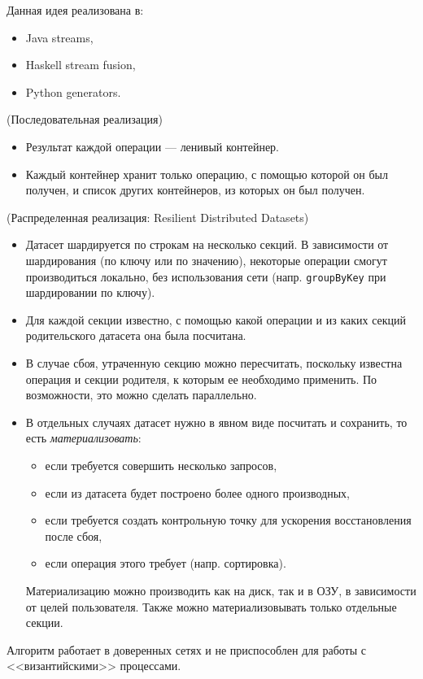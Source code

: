 \begin{remark} Данная идея реализована в:
  \begin{itemize}
    \item Java streams,
    \item Haskell stream fusion,
    \item Python generators.
  \end{itemize}
\end{remark}

\begin{algorithm}(Последовательная реализация)
  \begin{itemize}
    \item Результат каждой операции --- ленивый контейнер.
    \item Каждый контейнер хранит только операцию, с помощью которой он был
      получен, и список других контейнеров, из которых он был получен.
  \end{itemize}
\end{algorithm}

\begin{algorithm}(Распределенная реализация: Resilient Distributed Datasets)
  \begin{itemize}
    \item Датасет шардируется по строкам на несколько секций. В зависимости от шардирования (по ключу или по значению), некоторые
      операции смогут производиться локально, без использования сети (напр. \texttt{groupByKey} при шардировании по ключу).
    \item Для каждой секции известно, с помощью какой операции и из каких секций родительского датасета она была посчитана.
    \item В случае сбоя, утраченную секцию можно пересчитать, поскольку
      известна операция и секции родителя, к которым ее необходимо применить.
      По возможности, это можно сделать параллельно.
    \item В отдельных случаях датасет нужно в явном виде посчитать и сохранить, то есть \textit{материализовать}:
      \begin{itemize}
        \item если требуется совершить несколько запросов,
        \item если из датасета будет построено более одного производных,
        \item если требуется создать контрольную точку для ускорения
          восстановления после сбоя,
        \item если операция этого требует (напр. сортировка).
      \end{itemize}
      Материализацию можно производить как на диск, так и в ОЗУ, в зависимости
      от целей пользователя. Также можно материализовывать только отдельные
      секции.
  \end{itemize}
\end{algorithm}

\begin{remark} Алгоритм работает в доверенных сетях и не приспособлен для
  работы с <<византийскими>> процессами.
\end{remark}

